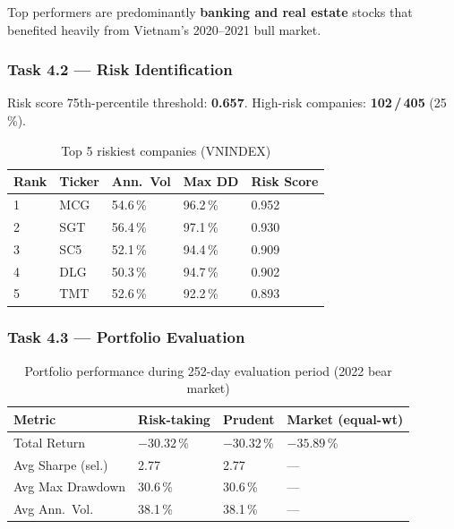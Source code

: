 \documentclass[12pt,a4paper]{article}
\begin{document}
Top performers are predominantly \textbf{banking and real estate} stocks that
benefited heavily from Vietnam's 2020--2021 bull market.

\subsubsection{Task 4.2 --- Risk Identification}

Risk score 75th-percentile threshold: \textbf{0.657}.
High-risk companies: \textbf{102\,/\,405} (25\,\%).

\begin{table}[H]
\centering
\caption{Top 5 riskiest companies (VNINDEX)}
\begin{tabular}{lllll}
\toprule
\textbf{Rank} & \textbf{Ticker} & \textbf{Ann.\ Vol} & \textbf{Max DD} & \textbf{Risk Score} \\
\midrule
1 & MCG & 54.6\,\% & 96.2\,\% & 0.952 \\
2 & SGT & 56.4\,\% & 97.1\,\% & 0.930 \\
3 & SC5 & 52.1\,\% & 94.4\,\% & 0.909 \\
4 & DLG & 50.3\,\% & 94.7\,\% & 0.902 \\
5 & TMT & 52.6\,\% & 92.2\,\% & 0.893 \\
\bottomrule
\end{tabular}
\end{table}

\subsubsection{Task 4.3 --- Portfolio Evaluation}

\begin{table}[H]
\centering
\caption{Portfolio performance during 252-day evaluation period (2022 bear market)}
\begin{tabular}{llll}
\toprule
\textbf{Metric} & \textbf{Risk-taking} & \textbf{Prudent} & \textbf{Market (equal-wt)} \\
\midrule
Total Return       & $-30.32$\,\% & $-30.32$\,\% & $\mathbf{-35.89}$\,\% \\
Avg Sharpe (sel.)  & 2.77         & 2.77         & --- \\
Avg Max Drawdown   & 30.6\,\%     & 30.6\,\%     & --- \\
Avg Ann.\ Vol.     & 38.1\,\%     & 38.1\,\%     & --- \\
\bottomrule
\end{tabular}
\end{table}
\end{document}
